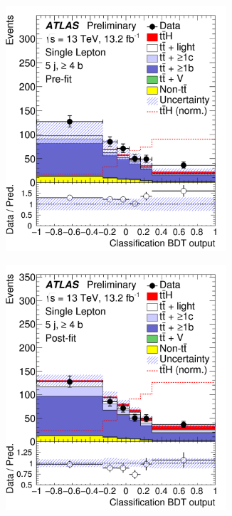 \begin{figure}[htbp!]
\begin{subfigure}{0.24\textwidth}
  \centering
  \includegraphics[width=0.9\textwidth]{figures/ttH/fig_11a.png}
  \caption{}
  \label{}
\end{subfigure}
\begin{subfigure}{0.24\textwidth}
  \centering
  \includegraphics[width=0.9\textwidth]{figures/ttH/fig_11b.png}

\end{subfigure}
\end{figure}
